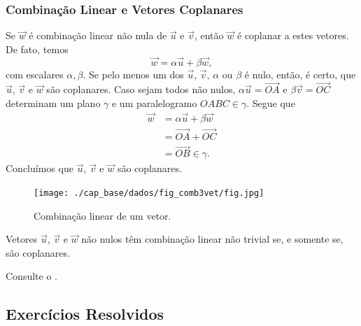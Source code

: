 \subsubsection{Combinação Linear e Vetores Coplanares}

Se $\vec{w}$ é combinação linear não nula de $\vec{u}$ e $\vec{v}$, então $\vec{w}$ é coplanar a estes vetores. De fato, temos
\begin{equation}
  \vec{w} = \alpha\vec{u} + \beta\vec{w},
\end{equation}
com escalares $\alpha,\beta$. Se pelo menos um dos $\vec{u}$, $\vec{v}$, $\alpha$ ou $\beta$ é nulo, então, é certo, que $\vec{u}$, $\vec{v}$ e $\vec{w}$ são coplanares. Caso sejam todos não nulos, $\alpha\vec{u}=\overrightarrow{OA}$ e $\beta\vec{v}=\overrightarrow{OC}$ determinam um plano $\gamma$ e um paralelogramo $OABC\in\gamma$. Segue que
\begin{align}
  \vec{w} &= \alpha\vec{u} + \beta\vec{w}\\
          &= \overrightarrow{OA} + \overrightarrow{OC}\\
          &= \overrightarrow{OB}\in\gamma. 
\end{align}
Concluímos que $\vec{u}$, $\vec{v}$ e $\vec{w}$ são coplanares.

\begin{figure}[h]
  \centering
  \texttt{[image: ./cap\_base/dados/fig\_comb3vet/fig.jpg]}
  \caption{Combinação linear de um vetor.}
  \label{cap_base_sec_comblin:fig:comb3vet}
\end{figure}

\begin{proposicao}\label{cap_base_sec_comblin:prop:comb3vet}
  Vetores $\vec{u}$, $\vec{v}$ e $\vec{w}$ não nulos têm combinação linear não trivial se, e somente se, são coplanares.
\end{proposicao}
\begin{demonstracao}
  Consulte o .
\end{demonstracao}

\subsection{Exercícios Resolvidos}

